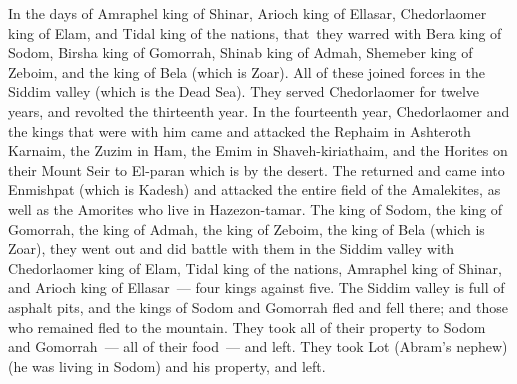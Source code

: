 
\begin{inparaenum}
   In the days of Amraphel king of Shinar, Arioch king of Ellasar, Chedorlaomer king of Elam, and Tidal king of the nations,%
   that\understood{}\ they warred with Bera king of Sodom, Birsha king of Gomorrah, Shinab king of Admah, Shemeber king of Zeboim, and the king of Bela (which is Zoar).%
   All of these joined forces in the Siddim valley (which is the Dead Sea).%
   They served Chedorlaomer for twelve years, and revolted the thirteenth year.%
   In the fourteenth year, Chedorlaomer and the kings that were with him came and attacked the Rephaim in Ashteroth Karnaim, the Zuzim in Ham, the Emim in Shaveh-kiriathaim,%
   and the Horites on their Mount Seir to El-paran which is by the desert.%
   The returned and came into Enmishpat (which is Kadesh) and attacked the entire field of the Amalekites, as well as the Amorites who live in Hazezon-tamar.%
   The king of Sodom, the king of Gomorrah, the king of Admah, the king of Zeboim, the king of Bela (which is Zoar), they went out and did battle with them in the Siddim valley%
   with Chedorlaomer king of Elam, Tidal king of the nations, Amraphel king of Shinar, and Arioch king of Ellasar~--- four kings against five.%
   The Siddim valley is full of asphalt pits, and the kings of Sodom and Gomorrah fled and fell there; and those who remained fled to the mountain.%
   They took all of their property to Sodom and Gomorrah~--- all of their food~--- and left.%
   They took Lot (Abram's nephew) (he was living in Sodom) and his property, and left.%

\end{inparaenum}
